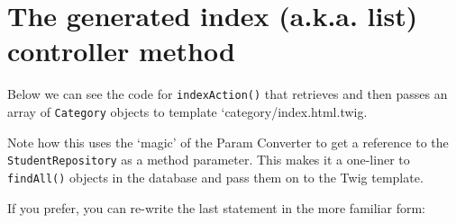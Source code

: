\documentclass[a4paperpaper,openright]{book}
\newenvironment{Shaded}{}{}
\newcommand{\AnnotationTok}[1]{\textcolor[rgb]{0.38,0.63,0.69}{\textbf{\textit{#1}}}}
\newcommand{\CommentTok}[1]{\textcolor[rgb]{0.38,0.63,0.69}{\textit{#1}}}
\newcommand{\KeywordTok}[1]{\textcolor[rgb]{0.00,0.44,0.13}{\textbf{#1}}}
\newcommand{\NormalTok}[1]{#1}
\newcommand{\OtherTok}[1]{\textcolor[rgb]{0.00,0.44,0.13}{#1}}
\newcommand{\StringTok}[1]{\textcolor[rgb]{0.25,0.44,0.63}{#1}}
\begin{document}
\hypertarget{the-generated-index-a.k.a.-list-controller-method}{%
\section{The generated index (a.k.a. list) controller
method}\label{the-generated-index-a.k.a.-list-controller-method}}

Below we can see the code for \texttt{indexAction()} that retrieves and
then passes an array of \texttt{Category} objects to template
`category/index.html.twig.

\begin{Shaded}
\end{Shaded}

Note how this uses the `magic' of the Param Converter to get a reference
to the \texttt{StudentRepository} as a method parameter. This makes it a
one-liner to \texttt{findAll()} objects in the database and pass them on
to the Twig template.

If you prefer, you can re-write the last statement in the more familiar
form:

\begin{Shaded}
\end{Shaded}
\end{document}
